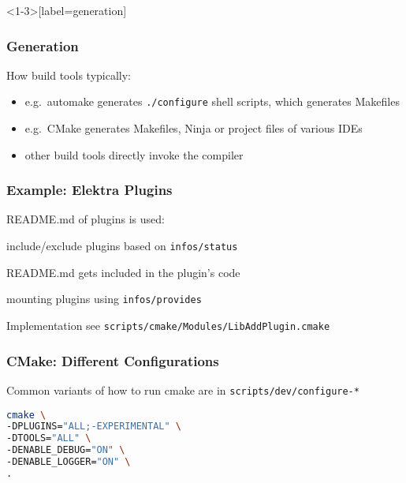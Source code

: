 \begin{frame}<1-3>[label=generation]
	\frametitle{Generation}

	How build tools typically:

	\begin{itemize}[<+-| alert@+>]
	\item e.g.\ automake generates \texttt{./configure} shell scripts, which generates Makefiles
	\item e.g.\ CMake generates Makefiles, Ninja or project files of various IDEs
	\item other build tools directly invoke the compiler
	\end{itemize}

\end{frame}

\begin{frame}
	\frametitle{Example: Elektra Plugins}

	README.md of plugins is used:

	\vspace{1em}
	\pause

	\begin{description}[<+-| alert@+>]
	\item[during configure time:] include/exclude plugins based on \texttt{infos/status}
	\item[during build time:] README.md gets included in the plugin's code
	\item[at run time:] mounting plugins using \texttt{infos/provides}
	\end{description}

	\vspace{1em}
	\pause[\thebeamerpauses]

	Implementation see \texttt{scripts/cmake/Modules/LibAddPlugin.cmake}
\end{frame}

\begin{frame}[fragile]
	\frametitle{CMake: Different Configurations}

	Common variants of how to run cmake are in \texttt{scripts/dev/configure-*}

	\begin{lstlisting}[language=sh]
cmake \
-DPLUGINS="ALL;-EXPERIMENTAL" \
-DTOOLS="ALL" \
-DENABLE_DEBUG="ON" \
-DENABLE_LOGGER="ON" \
.\end{lstlisting}
\end{frame}

